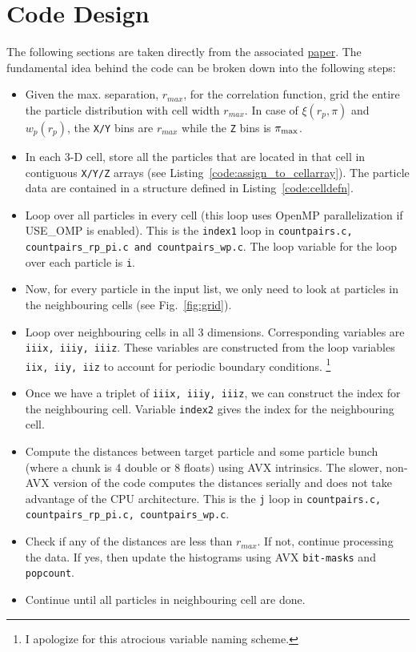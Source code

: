\documentclass[12pt,titlepage,justified]{article}
\let\stdsection\section
\newcommand{\rmax}{\ensuremath{{r_{max}}}\xspace}
\newcommand{\wprp}{\ensuremath{{w_p(r_p)}}\xspace}
\newcommand{\xirppi}{\ensuremath{{\xi(r_p,\pi)}}\xspace}
\newcommand{\pimax}{\ensuremath{{\pi_{\rm max}}}\xspace}
\begin{document}
\stdsection{Code Design}
The following sections are taken directly from the associated \href{http://adsabs.harvard.edu/abs/2014arXiv1405.5832L}{paper}. The fundamental idea 
behind the code can be broken down into the following steps:
\begin{itemize}
\item Given the max. separation, \rmax, for the correlation function, grid the entire the particle distribution with cell width \rmax. In case of 
\xirppi and \wprp, the \texttt{X/Y} bins are \rmax while the \texttt{Z} bins is \pimax.
\item In each 3-D cell, store all the particles that are located in that cell in contiguous \texttt{X/Y/Z} arrays (see Listing~\ref{code:assign_to_cellarray}). The particle data are contained in a structure 
defined in Listing~\ref{code:celldefn}.
\item Loop over all particles in every cell (this loop uses OpenMP parallelization if USE\_OMP is enabled). This is the \texttt{index1} loop in 
\texttt{countpairs.c, countpairs\_rp\_pi.c and countpairs\_wp.c}. The loop variable for the loop over each particle is \texttt{i}.
\item Now, for every particle in the input list, we only need to look at particles in the neighbouring cells (see Fig.~\ref{fig:grid}). 
\item Loop over neighbouring cells in all 3 dimensions. Corresponding variables are \texttt{iiix, iiiy, iiiz}. These variables are constructed from the 
loop variables \texttt{iix, iiy, iiz} to account for periodic boundary conditions. \footnote{I apologize for this atrocious variable naming scheme.}
\item Once we have a triplet of \texttt{iiix, iiiy, iiiz}, we can construct the index for the neighbouring cell. Variable \texttt{index2} gives the index 
for the neighbouring cell. 
\item Compute the distances between target particle and some particle bunch (where a chunk is 4 double or 8 floats) using AVX intrinsics. The slower, non-AVX 
version of the code computes the distances serially and does not take advantage of the CPU architecture. This is the \texttt{j} loop in 
\texttt{countpairs.c, countpairs\_rp\_pi.c, countpairs\_wp.c}. 
\item Check if any of the distances are less than \rmax. If not, continue processing the data. If yes, then update the histograms using 
AVX \texttt{bit-masks} and \texttt{popcount}. 
\item Continue until all particles in neighbouring cell are done. 
\end{itemize}
\end{document}
